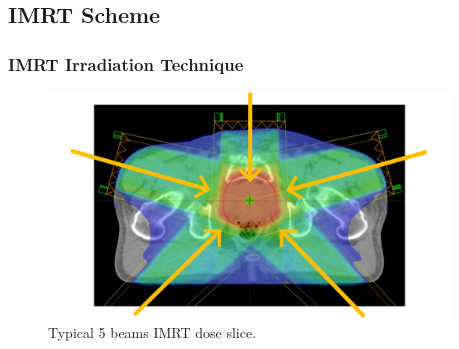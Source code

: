 \documentclass{beamer}
\begin{document}
	\subsection{IMRT Scheme}
	\begin{frame}
		\frametitle{IMRT Irradiation Technique}
		\begin{figure}
			\includegraphics[height=6cm]{vector_images/example_dose_imrt5_arrows.pdf}
			\caption{Typical 5 beams IMRT dose slice.}
		\end{figure}
	\end{frame}
	
\end{document}
